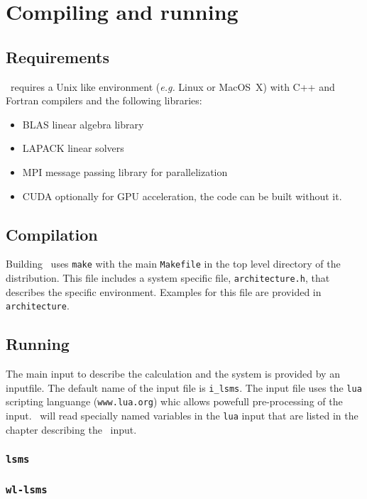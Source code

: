 \chapter{Compiling and running \LSMS}
\section{Requirements}
\LSMS\ requires a Unix like environment (\textit{e.g.}
Linux or MacOS~X) with C++ and Fortran compilers and the following libraries:
\begin{itemize}
\item BLAS linear algebra library
\item LAPACK linear solvers
\item MPI message passing library for parallelization
\item CUDA optionally for GPU acceleration, the code can be built without it.
\end{itemize}

\section{Compilation}
Building \LSMS\ uses \texttt{make} with the main \texttt{Makefile} in the top level directory of the distribution. This file includes a system specific file, \texttt{architecture.h}, that describes the specific environment. Examples for this file are provided in \texttt{architecture}.


\section{Running}

The main input to describe the calculation and the system is provided by an
inputfile. The default name of the input file is \texttt{i\_lsms}.
The input file uses the \texttt{lua} scripting languange (\texttt{www.lua.org}) whic allows
powefull pre-processing of the input.
\LSMS\ will read specially named variables in the \texttt{lua} input that are listed in the chapter describing
the \LSMS\ input.

\subsection{\texttt{lsms}}

\subsection{\texttt{wl-lsms}}

